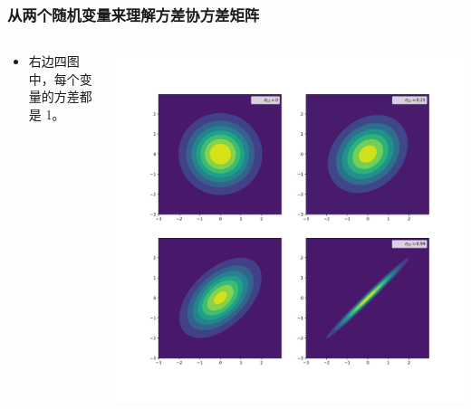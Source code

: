 \documentclass[serif,aspectratio=169]{beamer}
\begin{document}
\begin{frame}
  \frametitle{从两个随机变量来理解方差协方差矩阵}
  \begin{columns}
    \begin{column}{.44\textwidth}

      \pause
      \begin{itemize}
      \item 右边四图中，每个变量的方差都是 1。
      \end{itemize}
    \end{column}
    
    \begin{column}{.56\textwidth}
      \includegraphics[width=\textwidth]{img/contourf-4.png}
    \end{column}
  \end{columns}
\end{frame}
\end{document}
